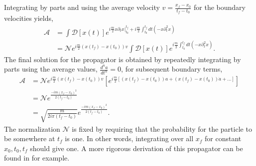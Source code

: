 Integrating by parts and using the average velocity $v = \frac{x_f-x_0}{t_f - t_0}$ for the boundary velocities yields,
\begin{equation}
\begin{split}
\mathcal{A} &= \int \mathcal{D}[x(t)] e^{i\frac{m}{2}x\partial_t x|^{t_f}_{t_0} + i\frac{m}{2}\int_{t_0}^{t_f} dt (-x \partial^2_t x)} \\ 
            &= \mathcal{N}e^{i\frac{m}{2}(x(t_f) - x(t_0))v}\int \mathcal{D}[x(t)] e^{i\frac{m}{2}\int_{t_0}^{t_f} dt (-x \partial^2_t x)}.
\end{split}
\end{equation}
The final solution for the propagator is obtained by repeatedly integrating by parts using the average values, $\frac{d^na}{dt^n}=0$, for subsequent boundary terms,
\begin{equation}
\begin{split}
\mathcal{A} &= \mathcal{N}e^{i\frac{m}{2}(x(t_f) - x(t_0))v}\left[e^{i\frac{m}{2}[(x(t_f) - x(t_0))a + (x(t_f) - x(t_0))\dot{a} + ...]}\right] \\ 
            &= \mathcal{N}e^{\frac{-im(x_f - x_0)^2}{2(t_f - t_0)}} \\
            &= \sqrt{\frac{m}{2i\pi(t_f-t_0)}}e^{\frac{-im(x_f - x_0)^2}{2(t_f - t_0)}}.
\end{split}
\end{equation}
The normalization $\mathcal{N}$ is fixed by requiring that the probability for the particle to be somewhere at $t_f$ is one. In other words, integrating over all $x_f$ for constant $x_0, t_0, t_f$ should give one. A more rigorous derivation of this propagator can be found in \cite{feynhibbs} for example.

